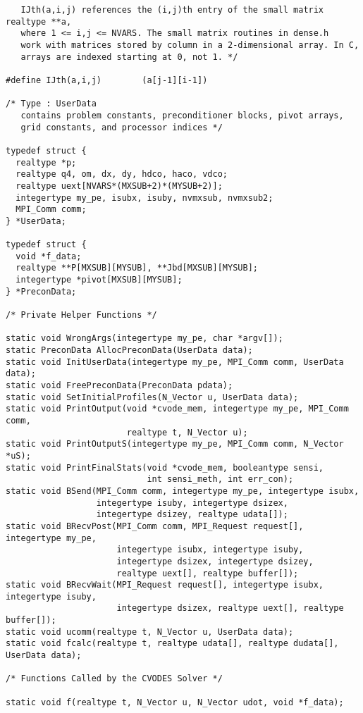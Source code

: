 \begin{verbatim}
   IJth(a,i,j) references the (i,j)th entry of the small matrix realtype **a,
   where 1 <= i,j <= NVARS. The small matrix routines in dense.h
   work with matrices stored by column in a 2-dimensional array. In C,
   arrays are indexed starting at 0, not 1. */

#define IJth(a,i,j)        (a[j-1][i-1])

/* Type : UserData 
   contains problem constants, preconditioner blocks, pivot arrays, 
   grid constants, and processor indices */

typedef struct {
  realtype *p;
  realtype q4, om, dx, dy, hdco, haco, vdco;
  realtype uext[NVARS*(MXSUB+2)*(MYSUB+2)];
  integertype my_pe, isubx, isuby, nvmxsub, nvmxsub2;
  MPI_Comm comm;
} *UserData;

typedef struct {
  void *f_data;
  realtype **P[MXSUB][MYSUB], **Jbd[MXSUB][MYSUB];
  integertype *pivot[MXSUB][MYSUB];
} *PreconData;

/* Private Helper Functions */

static void WrongArgs(integertype my_pe, char *argv[]);
static PreconData AllocPreconData(UserData data);
static void InitUserData(integertype my_pe, MPI_Comm comm, UserData data);
static void FreePreconData(PreconData pdata);
static void SetInitialProfiles(N_Vector u, UserData data);
static void PrintOutput(void *cvode_mem, integertype my_pe, MPI_Comm comm,
                        realtype t, N_Vector u);
static void PrintOutputS(integertype my_pe, MPI_Comm comm, N_Vector *uS);
static void PrintFinalStats(void *cvode_mem, booleantype sensi, 
                            int sensi_meth, int err_con);
static void BSend(MPI_Comm comm, integertype my_pe, integertype isubx, 
                  integertype isuby, integertype dsizex, 
                  integertype dsizey, realtype udata[]);
static void BRecvPost(MPI_Comm comm, MPI_Request request[], integertype my_pe,
                      integertype isubx, integertype isuby,
                      integertype dsizex, integertype dsizey,
                      realtype uext[], realtype buffer[]);
static void BRecvWait(MPI_Request request[], integertype isubx, integertype isuby,
                      integertype dsizex, realtype uext[], realtype buffer[]);
static void ucomm(realtype t, N_Vector u, UserData data);
static void fcalc(realtype t, realtype udata[], realtype dudata[], UserData data);

/* Functions Called by the CVODES Solver */

static void f(realtype t, N_Vector u, N_Vector udot, void *f_data);


\end{verbatim}
